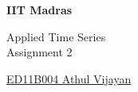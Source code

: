 \documentclass[11pt,paper=a4,answers]{exam}
\begin{document}

\noindent
\begin{minipage}[l]{.1\textwidth}%
\noindent
\end{minipage}
\hfill
\begin{minipage}[r]{.68\textwidth}%
\begin{center}
{\large \bfseries IIT Madras \par
\Large Applied Time Series \\[2pt]
\small Assignment 2  \par}
\end{center}
\end{minipage}
\par
\noindent
\uline{ED11B004   \hfill \normalsize\emph \hfill       Athul Vijayan}
\end{document}
